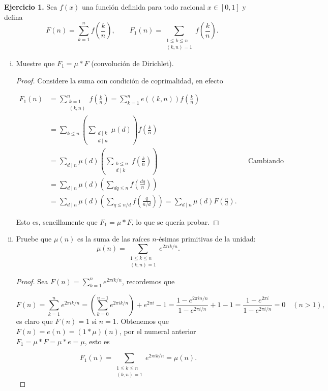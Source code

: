 \documentclass[12pt, a4paper]{article}
\begin{document}
\textbf{Ejercicio 1.} Sea $f(x)$ una función definida para todo racional $x\in[0,1]$ y defina
\[
	F(n)=\sum_{k=1}^{n} f\!\left(\frac{k}{n}\right),
	\qquad
	F_1(n)=\sum_{\substack{1\leq k\leq n\\ (k,n)=1}} f\!\left(\frac{k}{n}\right).
\]
\begin{enumerate}[(i)]
	\item Muestre que $F_1=\mu * F$ (convolución de Dirichlet).

	      \begin{proof}
		      Considere la suma con condición de coprimalidad, en efecto

		      \begin{align*}
			      F_1(n) & =\sum_{\substack{k=1\\(k,n)}}^n f\left(\frac{k}{n}\right)=\sum_{k=1}^n e((k,n))f\left(\frac{k}{n}\right)                                                               \\
			             & =\sum_{k\leq n}\left(\sum_{\substack{d\mid k\\d\mid n}}\mu(d)\right)f\left(\frac{k}{n}\right)                                                                          \\
			             & =\sum_{d\mid n}\mu(d)\left(\sum_{\substack{k\leq n\\d\mid k}}f\left(\frac{k}{n}\right)\right)                               &  & \text{Cambiando el orden de sumación} \\
			             & =\sum_{d\mid n}\mu(d)\left(\sum_{dq\leq n}f\left(\frac{dq}{n}\right)\right)                                                                                            \\
			             & =\sum_{d\mid n}\mu(d)\left(\sum_{q\leq n/d}f\left(\frac{q}{n/d}\right)\right)=\sum_{d\mid n}\mu(d)F\left(\frac{n}{d}\right)
			      .\end{align*}

		      Esto es, sencillamente que $F_1=\mu*F$, lo que se quería probar.
	      \end{proof}

	\item Pruebe que $\mu(n)$ es la suma de las raíces $n$-ésimas primitivas de la unidad:
	      \[
		      \mu(n)=\sum_{\substack{1\leq k\leq n\\(k,n)=1}} e^{2\pi i k/n}.
	      \]

	      \begin{proof}
		      Sea $F(n)=\displaystyle\sum_{k=1}^ne^{2\pi ik/n}$, recordemos que

		      $$F(n)=
			      \sum_{k=1}^n e^{2\pi i k/n}
			      = \left(\sum_{k=0}^{n-1} e^{2\pi i k/n}\right) + e^{2\pi i}
			      - 1
			      = \frac{1 - e^{2\pi i n/n}}{1 - e^{2\pi i/n}} + 1 - 1
			      = \frac{1 - e^{2\pi i}}{1 - e^{2\pi i/n}}
			      = 0 \quad (n>1),
		      $$
		      es claro que $F(n)=1$ si $n=1$. Obtenemos que $F(n)=e(n)=(1*\mu)(n)$, por el numeral anterior $F_1=\mu* F=\mu*e=\mu$, esto es

		      \[F_1(n)=\sum_{\substack{1\leq k\leq n\\(k,n)=1}} e^{2\pi i k/n}=\mu(n).
		      \]
	      \end{proof}
\end{enumerate}
\end{document}
